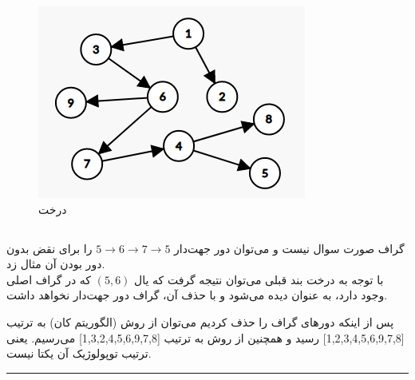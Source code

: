 \documentclass{article}
\begin{document}
\begin{multicols}{2}
\begin{figure}[H]
    \center
    \includegraphics[width=0.5\linewidth]{Photos/HW2/backedge.png}
    \caption{
    درخت
    }
    \label{fig:my_label}
\end{figure}
\subsection*{}
گراف صورت سوال
نیست و می‌توان دور جهت‌دار
$5 \rightarrow 6 \rightarrow 7 \rightarrow 5$
را برای نقض بدون دور بودن آن مثال زد.\\
با توجه به درخت
بند قبلی می‌توان نتیجه گرفت که یال
$(5, 6)$
که در گراف اصلی وجود دارد، به عنوان
دیده می‌شود و با حذف آن، گراف دور جهت‌دار نخواهد داشت.

پس از اینکه دورهای گراف را حذف کردیم می‌توان از روش
(الگوریتم کان) به ترتیب
[1,2,3,4,5,6,9,7,8]
رسید و همچنین از روش
به ترتیب
[1,3,2,4,5,6,9,7,8]
می‌رسیم. یعنی ترتیب توپولوژیک آن یکتا نیست.\\
\rule{\linewidth}{1pt}


\end{multicols}
\end{document}
